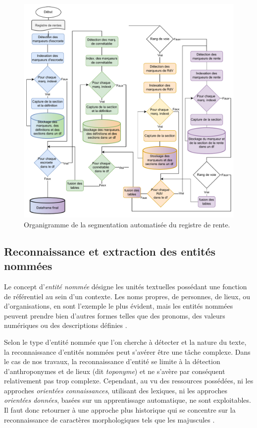 \begin{figure}[ht] %
    \centering
    \includegraphics[scale=0.75]{2.Methods/Img/seg.drawio.pdf} 
    \caption{Organigramme de la segmentation automatisée du registre de rente.}
    \label{schemaSeg}
\end{figure}

\subsection{Reconnaissance et extraction des entités nommées}
Le concept d'\textit{entité nommée} désigne les unités textuelles possédant une fonction de référentiel au sein d'un contexte. Les noms propres, de personnes, de lieux, ou d'organisations, en sont l'exemple le plus évident, mais les entités nommées peuvent prendre bien d'autres formes telles que des pronoms, des valeurs numériques ou des descriptions définies \parencite{omrane_les_2010,nadeau_survey_2007}.

Selon le type d'entité nommée que l'on cherche à détecter et la nature du texte, la reconnaissance d'entités nommées peut s'avérer être une tâche complexe. Dans le cas de nos travaux, la reconnaissance d'entité se limite à la détection d'anthroponymes et de lieux (dit \textit{toponyme}) et ne s'avère par conséquent relativement pas trop complexe. Cependant, au vu des ressources possédées, ni les approches \textit{orientées connaissances}, utilisant des lexiques, ni les approches \textit{orientées données}, basées sur un apprentissage automatique,  ne sont exploitables. Il faut donc retourner à une  approche plus historique qui se concentre sur la reconnaissance de caractères morphologiques tels que les majuscules \parencite{nouvel_reconnaissance_2012}. 

